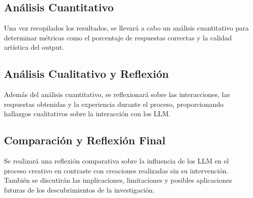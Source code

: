 \subsection{Análisis Cuantitativo}
Una vez recopilados los resultados, se llevará a cabo un análisis cuantitativo para determinar métricas como el porcentaje de respuestas correctas y la calidad artística del output.

\subsection{Análisis Cualitativo y Reflexión}
Además del análisis cuantitativo, se reflexionará sobre las interacciones, las respuestas obtenidas y la experiencia durante el proceso, proporcionando hallazgos cualitativos sobre la interacción con los LLM.

\subsection{Comparación y Reflexión Final}
Se realizará una reflexión comparativa sobre la influencia de los LLM en el proceso creativo en contraste con creaciones realizadas sin su intervención. También se discutirán las implicaciones, limitaciones y posibles aplicaciones futuras de los descubrimientos de la investigación.